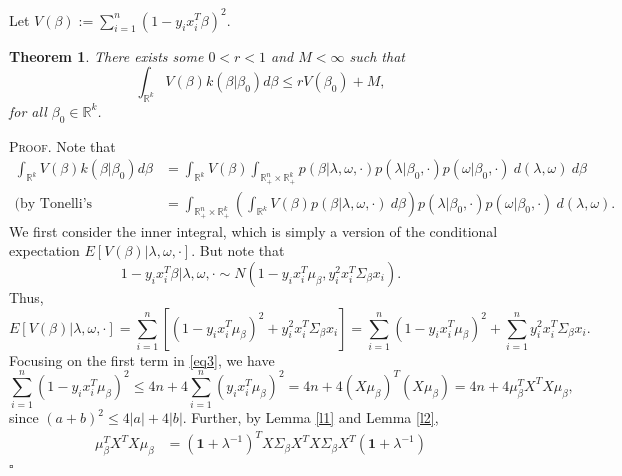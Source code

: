 \documentclass[12pt]{article}
\newtheorem{theorem}{Theorem}
\newcounter{ProofCounter}
\newenvironment{Proof}{\stepcounter{ProofCounter}\textsc{Proof.}}{\hfill$\square$}
\begin{document}
Let $V(\beta) := \sum_{i=1}^{n}(1 - y_ix_i^T\beta)^2$. \\

\begin{theorem}
  There exists some $0 < r < 1$ and $M < \infty$ such that 
  \[
    \int_{\mathbb{R}^{k}} V(\beta)k(\beta|\beta_0)d\beta \leq r V(\beta_0) + M,
  \]
  for all $\beta_0 \in \mathbb{R}^{k}$.
  \label{thm1}
\end{theorem}

\begin{Proof}
  Note that 
  \begin{align}
    \int_{\mathbb{R}^{k}} V(\beta) k(\beta|\beta_0)d\beta & = \int_{\mathbb{R}^{k}}V(\beta) \int_{\mathbb{R}^{n}_+\times \mathbb{R}^{k}_+}
    p(\beta|\lambda,\omega, \cdot)p(\lambda|\beta_0, \cdot)p(\omega|\beta_0, \cdot)\ d(\lambda, \omega)\ d\beta \nonumber \\
    \text{(by Tonelli's Theorem)} \ & = \int_{\mathbb{R}^{n}_+\times\mathbb{R}^{k}_+} \left( \int_{\mathbb{R}^{k}} V(\beta)p(\beta|\lambda, \omega,
    \cdot)\ d\beta \right) p(\lambda|\beta_0,\cdot)p(\omega|\beta_0, \cdot)\ d(\lambda, \omega).
    \label{eq0}
  \end{align}
  We first consider the inner integral, which is simply a version of the conditional expectation $E[V(\beta)|\lambda,\omega,\cdot]$.
  But note that 
  \begin{equation*}
    1 - y_ix_i^T\beta | \lambda, \omega, \cdot \sim N\left( 1 - y_ix_i^T\mu_{\beta}, y_i^2 x_i^T \Sigma_{\beta}x_i\right).
    \label{eq2}
  \end{equation*}
  Thus,
  \begin{equation}
    E[V(\beta)|\lambda,\omega,\cdot] = \sum_{i=1}^{n}\left[(1 - y_ix_i^T\mu_{\beta})^2 + y_i^2 x_i^T \Sigma_{\beta} x_i\right] = \sum_{i=1}^{n}
    (1 - y_ix_i^T\mu_{\beta})^2 + \sum_{i=1}^{n}y_i^2x_i^T\Sigma_{\beta}x_i.
    \label{eq3}
  \end{equation}
  Focusing on the first term in \eqref{eq3}, we have 
  \begin{equation}
    \sum_{i=1}^{n}(1 - y_i x_i^T \mu_{\beta})^2 \leq 4n + 4\sum_{i=1}^{n}(y_ix_i^T \mu_{\beta})^2 = 4n + 4(X\mu_{\beta})^T (X\mu_{\beta}) 
    = 4n + 4\mu_{\beta}^T X^T X \mu_{\beta},
    \label{eq4}
  \end{equation}
  since $(a + b)^2 \leq 4|a| + 4|b|$. Further, by Lemma \ref{l1} and Lemma \ref{l2},
  \begin{align}
    \mu_{\beta}^T X^T X \mu_{\beta} & = (\bm{1} + \lambda^{-1})^T X \Sigma_{\beta}X^T X\Sigma_{\beta} X^T (\bm{1} + \lambda^{-1}) \nonumber \\

\end{align}
\end{Proof}
\end{document}
